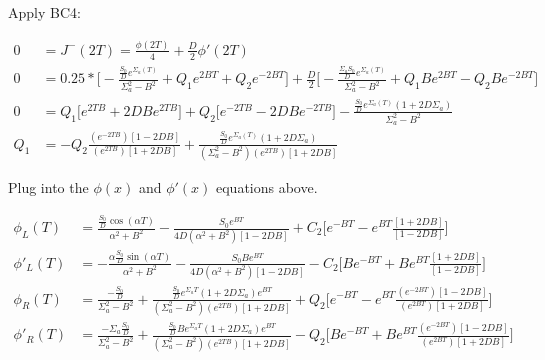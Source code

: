 \documentclass{amsart}
\theoremstyle{definition}
\begin{document}
\bigbreak

Apply BC4:

\begin{align*}

    0 &= J^-(2T) = \frac{\phi(2T)}{4}+\frac{D}{2}\phi'(2T) \\

    0 &= 0.25*\bigg[-\frac{\frac{S_0}{D}e^{\Sigma_a(T)}}{\Sigma_a^2-B^2}+Q_1e^{2BT}+Q_2e^{-2BT}\bigg]+\frac{D}{2}\bigg[-\frac{\frac{\Sigma_a S_0}{D}e^{\Sigma_a(T)}}{\Sigma_a^2-B^2}+Q_1Be^{2BT}-Q_2Be^{-2BT}\bigg] \\

    0 &= Q_1\bigg[e^{2TB}+2DBe^{2TB}\bigg] + Q_2\bigg[e^{-2TB}-2DBe^{-2TB}\bigg]-\frac{\frac{ S_0}{D}e^{\Sigma_a(T)}(1+2D\Sigma_a)}{\Sigma_a^2-B^2} \\

    Q_1 &= -Q_2 \frac{(e^{-2TB})[1-2DB]}{(e^{2TB})[1+2DB]} + \frac{\frac{ S_0}{D}e^{\Sigma_a(T)}(1+2D\Sigma_a)}{(\Sigma_a^2-B^2)(e^{2TB})[1+2DB]}

\end{align*}

\bigbreak

Plug into the $\phi(x)$ and $\phi'(x)$ equations above.

\bigbreak

\begin{align*}

    \phi_L(T) &= \frac{\frac{S_0}{D}\cos(\alpha T)}{\alpha^2+B^2} - \frac{S_0e^{BT}}{4D(\alpha^2+B^2)[1-2DB]} +C_2\bigg[e^{-BT}-e^{BT}\frac{[1+2DB]}{[1-2DB]}\bigg] \\

    \phi'_L(T) &= -\frac{\alpha\frac{S_0}{D}\sin(\alpha T)}{\alpha^2+B^2} - \frac{S_0Be^{BT}}{4D(\alpha^2+B^2)[1-2DB]} -C_2\bigg[Be^{-BT}+Be^{BT}\frac{[1+2DB]}{[1-2DB]}\bigg] \\

    \phi_R(T) &= \frac{-\frac{S_0}{D}}{\Sigma_a^2-B^2} + \frac{\frac{S_0}{D}e^{\Sigma_a T}(1+2D\Sigma_a)e^{BT}}{(\Sigma_a^2-B^2)(e^{2TB})[1+2DB]} +Q_2\bigg[e^{-BT}-e^{BT}\frac{(e^{-2BT})[1-2DB]}{(e^{2BT})[1+2DB]}\bigg] \\

    \phi'_R(T) &= \frac{-\Sigma_a\frac{S_0}{D}}{\Sigma_a^2-B^2} + \frac{\frac{S_0}{D}Be^{\Sigma_a T}(1+2D\Sigma_a)e^{BT}}{(\Sigma_a^2-B^2)(e^{2TB})[1+2DB]} -Q_2\bigg[Be^{-BT}+Be^{BT}\frac{(e^{-2BT})[1-2DB]}{(e^{2BT})[1+2DB]}\bigg]

\end{align*}
\end{document}
